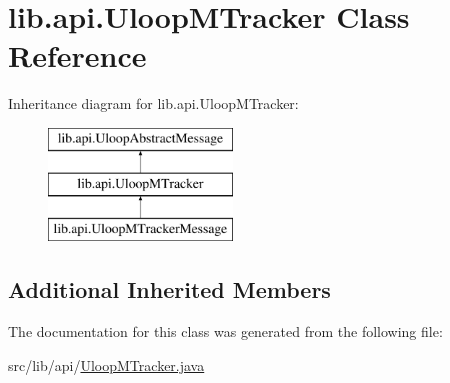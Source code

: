 \hypertarget{classlib_1_1api_1_1UloopMTracker}{\section{lib.\+api.\+Uloop\+M\+Tracker Class Reference}
\label{classlib_1_1api_1_1UloopMTracker}
}
Inheritance diagram for lib.\+api.\+Uloop\+M\+Tracker\+:\begin{figure}[H]
\begin{center}
\leavevmode
\includegraphics[height=3.000000cm]{classlib_1_1api_1_1UloopMTracker}
\end{center}
\end{figure}
\subsection*{Additional Inherited Members}


The documentation for this class was generated from the following file\+:\begin{DoxyCompactItemize}
\item 
src/lib/api/\hyperlink{UloopMTracker_8java}{Uloop\+M\+Tracker.\+java}\end{DoxyCompactItemize}

